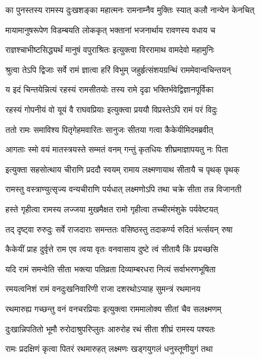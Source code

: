 \twolineshloka
{का पुनस्तस्य रामस्य दुःखशङ्का महात्मनः}
{रामनाम्नैव मुक्तिः स्यात् कलौ नान्येन केनचित्} %

\twolineshloka
{मायामानुषरूपेण विडम्बयति लोककृत्}
{भक्तानां भजनार्थाय रावणस्य वधाय च} %

\twolineshloka
{राज्ञश्चाभीष्टसिद्ध्यर्थं मानुषं वपुराश्रितः}
{इत्युक्त्वा विररामाथ वामदेवो महामुनिः} %

\twolineshloka
{श्रुत्वा तेऽपि द्विजाः सर्वे रामं ज्ञात्वा हरिं विभुम्}
{जहुर्हृत्संशयग्रन्थिं राममेवान्वचिन्तयन्} %

\twolineshloka
{य इदं चिन्तयेन्नित्यं रहस्यं रामसीतयोः}
{तस्य रामे दृढा भक्तिर्भवेद्विज्ञानपूर्विका} %

\twolineshloka
{रहस्यं गोपनीयं वो यूयं वै राघवप्रियाः}
{इत्युक्त्वा प्रययौ विप्रस्तेऽपि रामं परं विदुः} %

\twolineshloka
{ततो रामः समाविश्य पितृगेहमवारितः}
{सानुजः सीतया गत्वा कैकेयीमिदमब्रवीत्} %

\twolineshloka
{आगताः स्मो वयं मातस्त्रयस्ते सम्मतं वनम्}
{गन्तुं कृतधियः शीघ्रमाज्ञापयतु नः पिता} %

\twolineshloka
{इत्युक्ता सहसोत्थाय चीराणि प्रददौ स्वयम्}
{रामाय लक्ष्मणायाथ सीतायै च पृथक् पृथक्} %

\twolineshloka
{रामस्तु वस्त्राण्युत्सृज्य वन्यचीराणि पर्यधात्}
{लक्ष्मणोऽपि तथा चक्रे सीता तन्न विजानती} %

\twolineshloka
{हस्ते गृहीत्वा रामस्य लज्जया मुखमैक्षत}
{रामो गृहीत्वा तच्चीरमंशुके पर्यवेष्टयत्} %

\twolineshloka
{तद् दृष्ट्वा रुरुदुः सर्वे राजदाराः समन्ततः}
{वसिष्ठस्तु तदाकर्ण्य रुदितं भर्त्सयन् रुषा} %

\twolineshloka
{कैकेयीं प्राह दुर्वृत्ते राम एव त्वया वृतः}
{वनवासाय दुष्टे त्वं सीतायै किं प्रयच्छसि} %

\twolineshloka
{यदि रामं समन्वेति सीता भक्त्या पतिव्रता}
{दिव्याम्बरधरा नित्यं सर्वाभरणभूषिता} %

\twolineshloka
{रमयत्वनिशं रामं वनदुःखनिवारिणी}
{राजा दशरथोऽप्याह सुमन्त्रं रथमानय} %

\twolineshloka
{रथमारुह्य गच्छन्तु वनं वनचरप्रियाः}
{इत्युक्त्वा राममालोक्य सीतां चैव सलक्ष्मणम्} %

\twolineshloka
{दुःखान्निपतितो भूमौ रुरोदाश्रुपरिप्लुतः}
{आरुरोह रथं सीता शीघ्रं रामस्य पश्यतः} %

\twolineshloka
{रामः प्रदक्षिणं कृत्वा पितरं रथमारुहत्}
{लक्ष्मणः खड्गयुगलं धनुस्तूणीयुगं तथा} %

